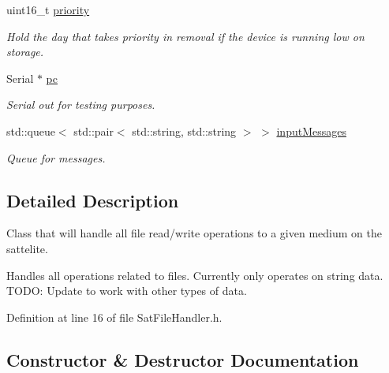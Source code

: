 \begin{DoxyCompactItemize}
uint16\+\_\+t \mbox{\hyperlink{class_sat_file_handler_ab7d2d4891d2de2fd472afab6af45dcba}{priority}}
\begin{DoxyCompactList}\small\item\em Hold the day that takes priority in removal if the device is running low on storage. \end{DoxyCompactList}\item 
\mbox{\label{class_sat_file_handler_a4bd885daea92333ad616498731cd8232}} 
Serial $\ast$ \mbox{\hyperlink{class_sat_file_handler_a4bd885daea92333ad616498731cd8232}{pc}}
\begin{DoxyCompactList}\small\item\em Serial out for testing purposes. \end{DoxyCompactList}\item 
\mbox{\label{class_sat_file_handler_a49a2391c78c0cca9ad796344dd7b33a6}} 
std\+::queue$<$ std\+::pair$<$ std\+::string, std\+::string $>$ $>$ \mbox{\hyperlink{class_sat_file_handler_a49a2391c78c0cca9ad796344dd7b33a6}{input\+Messages}}
\begin{DoxyCompactList}\small\item\em Queue for messages. \end{DoxyCompactList}\end{DoxyCompactItemize}


\subsection{Detailed Description}
Class that will handle all file read/write operations to a given medium on the sattelite. 

Handles all operations related to files. Currently only operates on string data. T\+O\+DO\+: Update to work with other types of data. 

Definition at line 16 of file Sat\+File\+Handler.\+h.



\subsection{Constructor \& Destructor Documentation}
\mbox{\label{class_sat_file_handler_a077c457c3daa568f5415b3d03d01a2a2}} 
